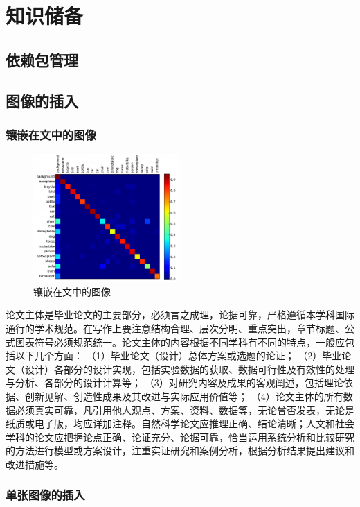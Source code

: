 \chapter{知识储备}
\section{依赖包管理}
\label{cha:example}
\section{图像的插入}
\subsection{镶嵌在文中的图像}
\label{sec:Images}
\begin{figure}
	\centering
	\includegraphics[width=0.5\textwidth]{image/result/confusion.pdf}
	\caption{镶嵌在文中的图像}
	\label{fig:confusion}
\end{figure}
论文主体是毕业论文的主要部分，必须言之成理，论据可靠，严格遵循本学科国际通行的学术规范。在写作上要注意结构合理、层次分明、重点突出，章节标题、公式图表符号必须规范统一。论文主体的内容根据不同学科有不同的特点，一般应包括以下几个方面： （1）毕业论文（设计）总体方案或选题的论证； （2）毕业论文（设计）各部分的设计实现，包括实验数据的获取、数据可行性及有效性的处理与分析、各部分的设计计算等； （3）对研究内容及成果的客观阐述，包括理论依据、创新见解、创造性成果及其改进与实际应用价值等； （4）论文主体的所有数据必须真实可靠，凡引用他人观点、方案、资料、数据等，无论曾否发表，无论是纸质或电子版，均应详加注释。自然科学论文应推理正确、结论清晰；人文和社会学科的论文应把握论点正确、论证充分、论据可靠，恰当运用系统分析和比较研究的方法进行模型或方案设计，注重实证研究和案例分析，根据分析结果提出建议和改进措施等。
\subsection{单张图像的插入}


